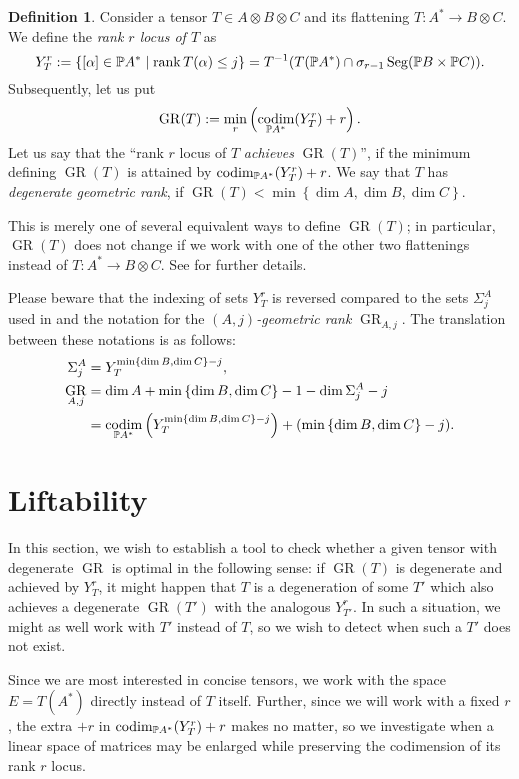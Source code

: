 \documentclass[a4paper,10pt]{article}
\def\zav#1{\left(#1\right)}
\def\set#1{\left\{#1\right\}}
\DeclareMathOperator{\rank}{rank}\let\rk\rank
\DeclareMathOperator{\codim}{codim}
\DeclareMathOperator{\Seg}{Seg}
\DeclareMathOperator{\GR}{GR}
\def\uv#1{``#1''}
\theoremstyle{definition}
\newtheorem{definition}[theorem]{Definition}
\theoremstyle{remark}
\begin{document}
\begin{definition}
Consider a tensor $T\in A\otimes B\otimes C$ and its flattening $T:A^*\to B\otimes C$. We define the \emph{rank $r$ locus of $T$} as
\[
    Y^r_T := \set{[\alpha]\in\pe A^* \mid \rank T(\alpha)\leq j} = T^{-1}(T(\pe A^*)\cap \sigma_{r-1}\Seg(\pe B\times\pe C)).
\]
Subsequently, let us put
\[
    \GR(T) := \min_{r}\zav{\codim_{\pe A^*}(Y^r_T)+r}.
\]
Let us say that the \uv{rank $r$ locus of $T$ \emph{achieves} $\GR(T)$}, if the minimum defining $\GR(T)$ is attained by $\codim_{\pe A^*}(Y^r_T)+r$. We say that $T$ has \emph{degenerate geometric rank}, if $\GR(T)<\min\set{\dim A,\dim B,\dim C}$.
\end{definition}
This is merely one of several equivalent ways to define $\GR(T)$; in particular, $\GR(T)$ does not change if we work with one of the other two flattenings instead of $T:A^*\to B\otimes C$. See \cite[Sections 2 and 3]{kopparty-moshkovitz-zuiddam} for further details.

Please beware that the indexing of sets $Y^r_T$ is reversed compared to the sets $\Sigma^A_j$ used in \cite{geng-landsberg} and the notation for the \emph{$(A,j)$-geometric rank} $\GR_{A,j}$. The translation between these notations is as follows:
\begin{align*}
    \Sigma^A_j &= Y^{\min\set{\dim B,\dim C}-j}_T,\\
    \GR_{A,j} &= \dim A+\min\set{\dim B,\dim C}-1-\dim\Sigma^A_j-j \\&= \codim_{\pe A^*}\zav{Y^{\min\set{\dim B,\dim C}-j}_T}+(\min\set{\dim B,\dim C}-j).
\end{align*}



\section{Liftability}

In this section, we wish to establish a tool to check whether a given tensor with degenerate $\GR$ is optimal in the following sense: if $\GR(T)$ is degenerate and achieved by $Y^r_T$, it might happen that $T$ is a degeneration of some $T'$ which also achieves a degenerate $\GR(T')$ with the analogous $Y^r_{T'}$. In such a situation, we might as well work with $T'$ instead of $T$, so we wish to detect when such a $T'$ does not exist.

Since we are most interested in concise tensors, we work with the space $E=T(A^*)$ directly instead of $T$ itself. Further, since we will work with a fixed $r$, the extra $+r$ in $\codim_{\pe A^*}(Y^r_T)+r$ makes no matter, so we investigate when a linear space of matrices may be enlarged while preserving the codimension of its rank $r$ locus.
\end{document}
